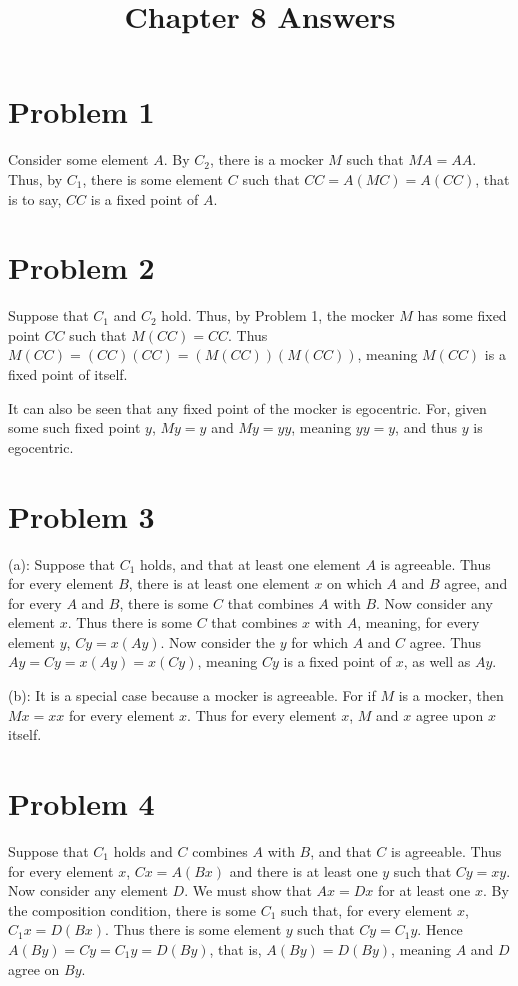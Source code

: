 \documentclass{article}
\title{Chapter 8 Answers}
\theoremstyle{definition}
\begin{document}
\date{}
\maketitle

\section*{Problem 1}
Consider some element $A$. By $C_2$, there is a mocker $M$ such that $MA=AA$. Thus, by $C_1$, there is some element $C$ such that 
$CC=A(MC)=A(CC)$, that is to say, $CC$ is a fixed point of $A$.

\section*{Problem 2}
Suppose that $C_1$ and $C_2$ hold. Thus, by Problem 1, the mocker $M$ has some fixed point $CC$ such that $M(CC)=CC$. Thus $M(CC)=(CC)(CC)=(M(CC))(M(CC))$, meaning $M(CC)$ is a fixed point of 
itself.


It can also be seen that any fixed point of the mocker is egocentric. For, given some such fixed point $y$, $My=y$ and $My=yy$, meaning $yy=y$, and thus $y$ is egocentric.

\section*{Problem 3}
(a): Suppose that $C_1$ holds, and that at least one element $A$ is agreeable. Thus for every element $B$, there is at least one element $x$ on which $A$ and $B$ agree, and for every 
$A$ and $B$, there is some $C$ that combines $A$ with $B$. Now consider any element $x$. Thus there is some $C$ that combines $x$ with $A$, meaning, for every element $y$, 
$Cy=x(Ay)$. Now consider the $y$ for which $A$ and $C$ agree. Thus $Ay=Cy=x(Ay)=x(Cy)$, meaning $Cy$ is a fixed point of $x$, as well as $Ay$.


(b): It is a special case because a mocker is agreeable. For if $M$ is a mocker, then $Mx=xx$ for every element $x$. Thus for every element $x$, $M$ and $x$ agree upon $x$ itself.  

\section*{Problem 4}
Suppose that $C_1$ holds and $C$ combines $A$ with $B$, and that $C$ is agreeable. Thus for every element $x$, $Cx=A(Bx)$ and there is at least one $y$ such that $Cy=xy$. Now consider any 
element $D$. We must show that $Ax=Dx$ for at least one $x$. By the composition condition, there is some $C_1$ such that, for every element $x$, $C_1x=D(Bx)$. Thus there is some element $y$ 
such that $Cy=C_1y$. Hence $A(By)=Cy=C_1y=D(By)$, that is, $A(By)=D(By)$, meaning $A$ and $D$ agree on $By$. 
\end{document}
